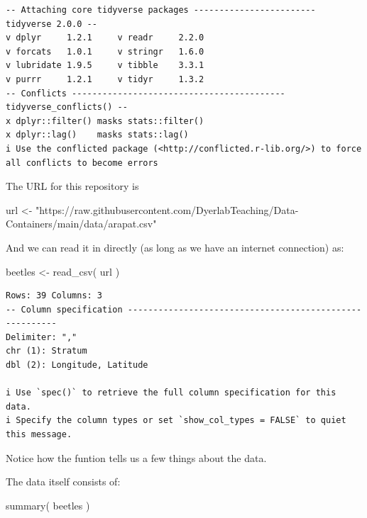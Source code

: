\documentclass[
  letterpaper,
]{book}
\newenvironment{Shaded}{\begin{snugshade}}{\end{snugshade}}
\newcommand{\FunctionTok}[1]{\textcolor[rgb]{0.28,0.35,0.67}{#1}}
\newcommand{\NormalTok}[1]{\textcolor[rgb]{0.00,0.23,0.31}{#1}}
\newcommand{\OtherTok}[1]{\textcolor[rgb]{0.00,0.23,0.31}{#1}}
\newcommand{\StringTok}[1]{\textcolor[rgb]{0.13,0.47,0.30}{#1}}
\begin{document}
\begin{verbatim}
-- Attaching core tidyverse packages ------------------------ tidyverse 2.0.0 --
v dplyr     1.2.1     v readr     2.2.0
v forcats   1.0.1     v stringr   1.6.0
v lubridate 1.9.5     v tibble    3.3.1
v purrr     1.2.1     v tidyr     1.3.2
-- Conflicts ------------------------------------------ tidyverse_conflicts() --
x dplyr::filter() masks stats::filter()
x dplyr::lag()    masks stats::lag()
i Use the conflicted package (<http://conflicted.r-lib.org/>) to force all conflicts to become errors
\end{verbatim}

The URL for this repository is

\begin{Shaded}
\begin{Highlighting}[]
\NormalTok{url }\OtherTok{\textless{}{-}} \StringTok{"https://raw.githubusercontent.com/DyerlabTeaching/Data{-}Containers/main/data/arapat.csv"}
\end{Highlighting}
\end{Shaded}

And we can read it in directly (as long as we have an internet
connection) as:

\begin{Shaded}
\begin{Highlighting}[]
\NormalTok{beetles }\OtherTok{\textless{}{-}} \FunctionTok{read\_csv}\NormalTok{( url )}
\end{Highlighting}
\end{Shaded}

\begin{verbatim}
Rows: 39 Columns: 3
-- Column specification --------------------------------------------------------
Delimiter: ","
chr (1): Stratum
dbl (2): Longitude, Latitude

i Use `spec()` to retrieve the full column specification for this data.
i Specify the column types or set `show_col_types = FALSE` to quiet this message.
\end{verbatim}

Notice how the funtion tells us a few things about the data.

The data itself consists of:

\begin{Shaded}
\begin{Highlighting}[]
\FunctionTok{summary}\NormalTok{( beetles )}
\end{Highlighting}
\end{Shaded}
\end{document}
